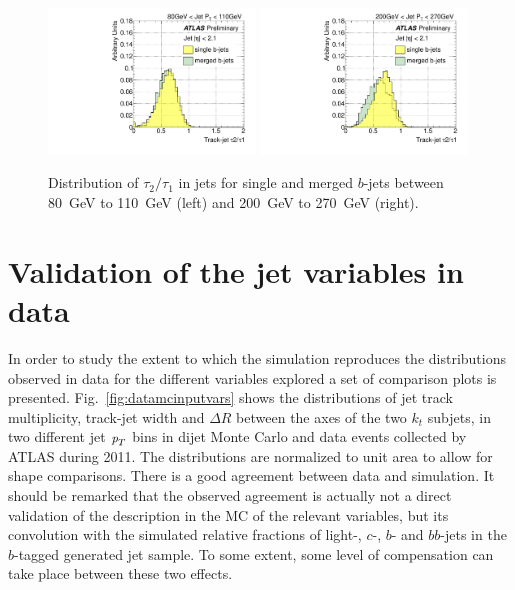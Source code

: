 \begin{figure}[tp]
\centering
\includegraphics[width=0.49\textwidth]{FIGS/VarsSingleMerged/TauRatio080.pdf}
\includegraphics[width=0.49\textwidth]{FIGS/VarsSingleMerged/TauRatio200.pdf}
\caption{Distribution of $\tau_2/\tau_1$ in jets for single and merged $b$-jets between 80~GeV to 110~GeV (left) and 200~GeV to 270~GeV (right).}
\label{fig:tauratiosinglemerged}
\end{figure}





\section{Validation of the jet variables in data}\label{sec:gbbValidation}

 In order to study the extent to which the simulation reproduces the distributions observed in data for the different variables explored a set of comparison plots is presented. Fig.~\ref{fig:datamcinputvars} shows the distributions of jet track multiplicity, track-jet width and $\Delta R$ between the axes of the two $k_t$ subjets, in two different jet ${\emph{p}_{T}}$ bins in dijet Monte Carlo and data events collected by ATLAS %
during 2011. The distributions are normalized to unit area to allow for shape comparisons. There is a good agreement between data and simulation. It should be remarked that the observed agreement is actually not a direct validation of the description in the MC of the relevant variables, but its convolution with the simulated relative fractions of light-, $c$-, $b$- and $bb$-jets in the $b$-tagged generated jet sample. To some extent, some level of compensation can take place between these two effects.

